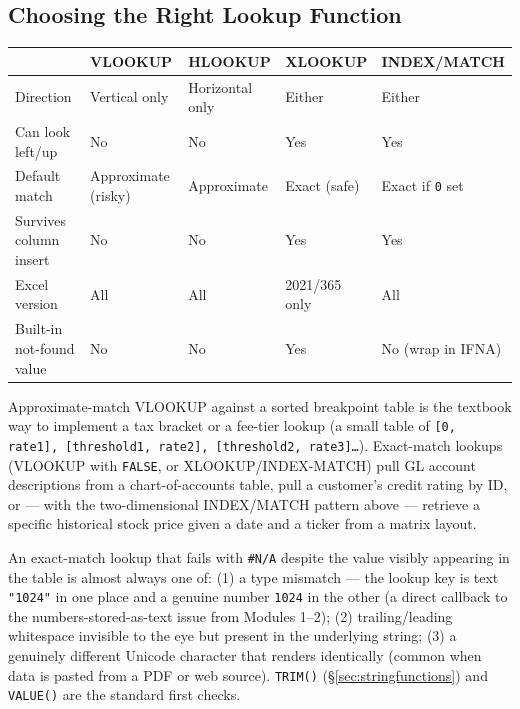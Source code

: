 \documentclass[11pt,a4paper]{article}
\begin{document}
\subsection{Choosing the Right Lookup Function}

\begin{center}
\begin{tabular}{@{}L{2.5cm}L{2.5cm}L{2.5cm}L{2.5cm}L{3.5cm}@{}}
\toprule
\textbf{} & \textbf{VLOOKUP} & \textbf{HLOOKUP} & \textbf{XLOOKUP} & \textbf{INDEX/MATCH} \\
\midrule
Direction & Vertical only & Horizontal only & Either & Either \\
Can look left/up & No & No & Yes & Yes \\
Default match & Approximate (risky) & Approximate & Exact (safe) & Exact if \texttt{0} set \\
Survives column insert & No & No & Yes & Yes \\
Excel version & All & All & 2021/365 only & All \\
Built-in not-found value & No & No & Yes & No (wrap in IFNA) \\
\bottomrule
\end{tabular}
\end{center}

\begin{financeapp}
Approximate-match VLOOKUP against a sorted breakpoint table is the textbook way to implement a tax bracket or a fee-tier lookup (a small table of \texttt{[0, rate1], [threshold1, rate2], [threshold2, rate3]\ldots}). Exact-match lookups (VLOOKUP with \texttt{FALSE}, or XLOOKUP/INDEX-MATCH) pull GL account descriptions from a chart-of-accounts table, pull a customer's credit rating by ID, or --- with the two-dimensional INDEX/MATCH pattern above --- retrieve a specific historical stock price given a date and a ticker from a matrix layout.
\end{financeapp}

\begin{pitfall}
An exact-match lookup that fails with \texttt{\#N/A} despite the value visibly appearing in the table is almost always one of: (1) a type mismatch --- the lookup key is text \texttt{"1024"} in one place and a genuine number \texttt{1024} in the other (a direct callback to the numbers-stored-as-text issue from Modules 1--2); (2) trailing/leading whitespace invisible to the eye but present in the underlying string; (3) a genuinely different Unicode character that renders identically (common when data is pasted from a PDF or web source). \texttt{TRIM()} (\S\ref{sec:stringfunctions}) and \texttt{VALUE()} are the standard first checks.
\end{pitfall}
\end{document}
